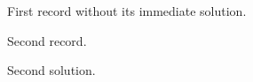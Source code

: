 \documentclass{physicsquiz}
\begin{document}
\begin{quizquestionbank}
  \begin{quizquestion}[id=first-question,topic=waves,difficulty=foundation,marks=1,correct=A,tags={wave}]
    First record without its immediate solution. 
  \end{quizquestion}
  \begin{quizquestion}[id=second-question,topic=optics,difficulty=applied,marks=1,correct=B,tags={optics}]
    Second record. 
  \end{quizquestion}
  \begin{quizsolution}Second solution.\end{quizsolution}
\end{quizquestionbank}
\end{document}
